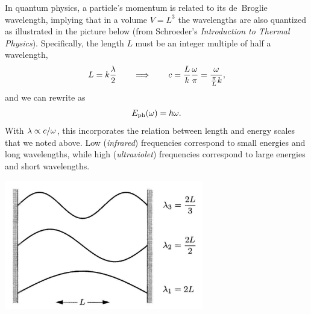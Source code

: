 In quantum physics, a particle's momentum is related to its de~Broglie wavelength, implying that in a volume $V = L^3$ the wavelengths are also quantized as illustrated in the picture below (from Schroeder's \textit{Introduction to Thermal Physics}).
Specifically, the length $L$ must be an integer multiple of half a wavelength,
\begin{equation*}
  L = k \frac{\lambda}{2} \qquad \Longrightarrow \qquad c = \frac{L}{k} \frac{\omega}{\pi} = \frac{\omega}{\frac{\pi}{L} k},
\end{equation*}
and we can rewrite  as
\begin{equation}
  \label{eq:photon_omega}
  E_{\text{ph}}(\omega) = \hbar \omega.
\end{equation}
With $\lambda \propto c / \omega$, this incorporates the relation between length and energy scales that we noted above.
Low (\textit{infrared}) frequencies correspond to small energies and long wavelengths, while high (\textit{ultraviolet}) frequencies correspond to large energies and short wavelengths. \\[-24 pt]
\begin{center}\includegraphics[width=0.65\textwidth]{figs/unit08_wavelengths.pdf}\end{center} %

